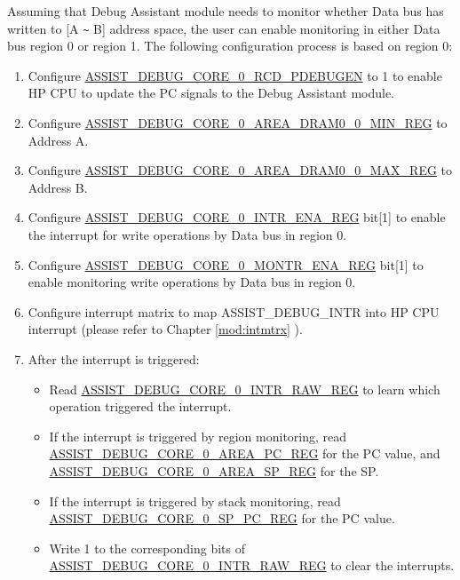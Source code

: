 \documentclass[main\_\_EN.tex]{subfiles}
\begin{document}
Assuming that Debug Assistant module needs to monitor whether Data bus has written to [A \verb+~+ B] address space, the user can enable monitoring in either Data bus region 0 or region 1. The following configuration process is based on region 0:

\begin{enumerate}
    \item Configure \hyperref[fielddesc:ASSISTDEBUGCORE0RCDPDEBUGEN]{ASSIST\_DEBUG\_CORE\_0\_RCD\_PDEBUGEN} to 1 to enable HP CPU to update the PC signals to the Debug Assistant module.
    \item Configure \hyperref[regdesc:ASSISTDEBUGCORE0AREADRAM00MINREG]{ASSIST\_DEBUG\_CORE\_0\_AREA\_DRAM0\_0\_MIN\_REG} to Address A.
    \item Configure \hyperref[regdesc:ASSISTDEBUGCORE0AREADRAM00MAXREG]{ASSIST\_DEBUG\_CORE\_0\_AREA\_DRAM0\_0\_MAX\_REG} to Address B.
    \item Configure \hyperref[regdesc:ASSISTDEBUGCORE0INTRENAREG]{ASSIST\_DEBUG\_CORE\_0\_INTR\_ENA\_REG} bit[1] to enable the interrupt for write operations by Data bus in region 0.
    \item Configure \hyperref[regdesc:ASSISTDEBUGCORE0MONTRENAREG]{ASSIST\_DEBUG\_CORE\_0\_MONTR\_ENA\_REG} bit[1] to enable monitoring write operations by Data bus in region 0.
    \item Configure interrupt matrix to map ASSIST\_DEBUG\_INTR into HP CPU interrupt (please refer to Chapter \ref{mod:intmtrx} \textit{}).
    \item After the interrupt is triggered:
    
    \begin{itemize}
        \item Read \hyperref[regdesc:ASSISTDEBUGCORE0INTRRAWREG]{ASSIST\_DEBUG\_CORE\_0\_INTR\_RAW\_REG} to learn which operation triggered the interrupt.
        
        \item If the interrupt is triggered by region monitoring, read \hyperref[regdesc:ASSISTDEBUGCORE0AREAPCREG]{ASSIST\_DEBUG\_CORE\_0\_AREA\_PC\_REG} for the PC value, and \hyperref[regdesc:ASSISTDEBUGCORE0AREASPREG]{ASSIST\_DEBUG\_CORE\_0\_AREA\_SP\_REG} for the SP.
        
        \item If the interrupt is triggered by stack monitoring, read \hyperref[regdesc:ASSISTDEBUGCORE0SPPCREG]{ASSIST\_DEBUG\_CORE\_0\_SP\_PC\_REG} for the PC value.
        
        \item Write 1 to the corresponding bits of \hyperref[regdesc:ASSISTDEBUGCORE0INTRRAWREG]{ASSIST\_DEBUG\_CORE\_0\_INTR\_RAW\_REG} to clear the interrupts.
    \end{itemize}

\end{enumerate}
\end{document}
